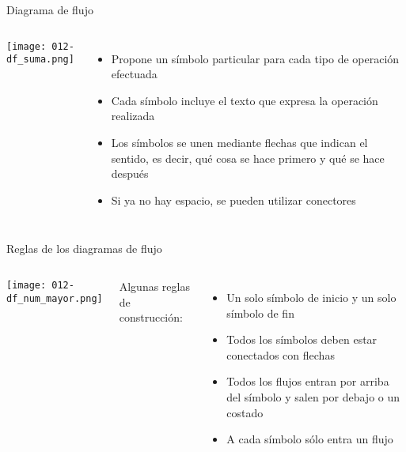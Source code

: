 \begin{frame}[c]{Diagrama de flujo}
  \begin{columns}
      \begin{center}
        \texttt{[image: 012-df\_suma.png]}
      \end{center}
      \begin{itemize}
        \item Propone un símbolo particular para cada tipo de operación efectuada
        \pausa
        \item Cada símbolo incluye el texto que expresa la operación realizada
        \pausa
        \item Los símbolos se unen mediante flechas que indican el sentido, es
          decir, qué cosa se hace primero y qué se hace después
        \pausa
        \item Si ya no hay espacio, se pueden utilizar conectores
      \end{itemize}
  \end{columns}
\end{frame}


\begin{frame}[c]{Reglas de los diagramas de flujo}
  \begin{columns}
      \begin{center}
        \texttt{[image: 012-df\_num\_mayor.png]}
      \end{center}
      Algunas reglas de construcción:
      \begin{itemize}
        \item Un solo símbolo de inicio y un solo símbolo de fin
        \pausa
        \item Todos los símbolos deben estar conectados con flechas
        \pausa
        \item Todos los flujos entran por arriba del símbolo y salen por debajo
          o un costado
        \pausa
        \item A cada símbolo sólo entra un flujo
      \end{itemize}
  \end{columns}
\end{frame}

